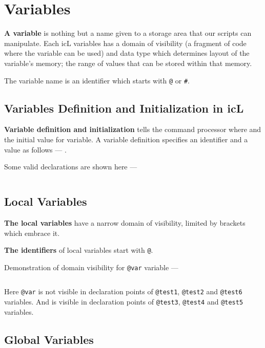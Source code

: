 \section{Variables}

\textbf{A variable} is nothing but a name given to a storage area that our scripts can manipulate. Each icL variables has a domain of visibility (a fragment of code where the variable can be used) and data type which determines layout of the variable's memory; the range of values that can be stored within that memory.

The variable name is an identifier which starts with \texttt{@} or \texttt{#}.

\subsection{Variables Definition and Initialization in icL}

\textbf{Variable definition and initialization} tells the command processor where and the initial value for variable. A variable definition specifies an identifier and a value as follows —
.

Some valid declarations are shown here —
\inputminted[linenos]{icl}{../sources/initexample.icL}

\subsection{Local Variables}

\textbf{The local variables} have a narrow domain of visibility, limited by brackets which embrace it.

{\bf The identifiers} of local variables start with \texttt{@}.

Demonstration of domain visibility for \texttt{@var} variable —
\inputminted[linenos]{icl}{../sources/localvars.icL}

Here \texttt{@var} is not visible in declaration points of \texttt{@test1}, \texttt{@test2} and \texttt{@test6} variables. And is visible in declaration points of \texttt{@test3}, \texttt{@test4} and \texttt{@test5} variables.

\subsection{Global Variables}

